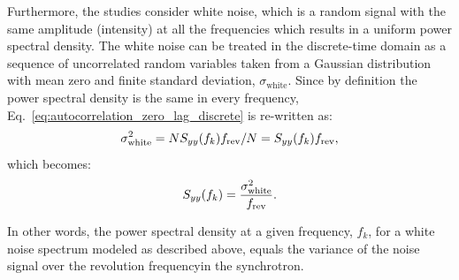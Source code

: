 Furthermore, the studies consider white noise, which is a random signal with the same amplitude (intensity) at all the frequencies which results in a uniform power spectral density. The white noise can be treated in the discrete-time domain as a sequence of uncorrelated random variables taken from a Gaussian distribution with mean zero and finite standard deviation, $\sigma_\mathrm{white}$.  Since by definition the power spectral density is the same in every frequency, Eq.~\eqref{eq:autocorrelation_zero_lag_discrete} is re-written as:
\begin{equation}\label{eq:psd_for_white_noise_variance_v0}
    \sigma_\mathrm{white}^2 =  N S_{yy}(f_k) {f_\mathrm{rev}}/N = S_{yy}(f_k) {f_\mathrm{rev}},
\end{equation}
which becomes:
\begin{equation}\label{eq:psd_for_white_noise_variance}
   S_{yy}(f_k) = \frac{\sigma_\mathrm{white}^2 } {{f_\mathrm{rev}}}.
\end{equation}


In other words, the power spectral density at a given frequency, $f_k$, for a white noise spectrum modeled as described above, equals the variance of the noise signal over the revolution frequencyin the synchrotron.



